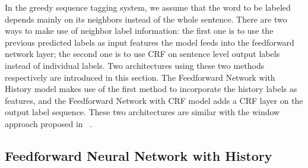 \documentclass{sfuthesis}
\begin{document}
In the greedy sequence tagging system, we assume that the word to be labeled depends mainly on its neighbors instead of the whole sentence. There are two ways to make use of neighbor label information: the first one is to use the previous predicted labels as input features the model feeds into the feedforward network layer; the second one is to use CRF on sentence level output labels instead of individual labels. Two architectures using these two methods respectively are introduced in this section. The Feedforward Network with History model makes use of the first method to incorporate the history labels as features, and the Feedforward Network with CRF model adds a CRF layer on the output label sequence. These two architectures are similar with the window approach proposed in ~\cite{collobert2011natural}.



\subsection{Feedforward Neural Network with History}
\end{document}
